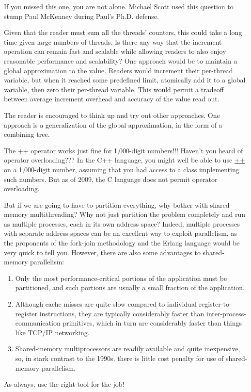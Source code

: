 	If you missed this one, you are not alone.
	Michael Scott used this question to stump Paul McKenney during Paul's
	Ph.D. defense.

\QuickQ{}
	Given that the reader must sum all the threads' counters,
	this could take a long time given large numbers of threads.
	Is there any way that the increment operation can remain
	fast and scalable while allowing readers to also enjoy
	reasonable performance and scalability?
\QuickA{}
	One approach would be to maintain a global approximation
	to the value.
	Readers would increment their per-thread variable, but when it
	reached some predefined limit, atomically add it to a global
	variable, then zero their per-thread variable.
	This would permit a tradeoff between average increment overhead
	and accuracy of the value read out.

	The reader is encouraged to think up and try out other approaches.
	One approach is a generalization of the global approximation,
	in the form of a combining tree.

\QuickQ{}
	The \url{++} operator works just fine for 1,000-digit numbers!!!
	Haven't you heard of operator overloading???
\QuickA{}
	In the C++ language, you might well be able to use \url{++}
	on a 1,000-digit number, assuming that you had access to a
	class implementing such numbers.
	But as of 2009, the C language does not permit operator overloading.

\QuickQ{}
	But if we are going to have to partition everything, why bother
	with shared-memory multithreading?
	Why not just partition the problem completely and run as
	multiple processes, each in its own address space?
\QuickA{}
	Indeed, multiple processes with separate address spaces can be
	an excellent way to exploit parallelism, as the proponents of
	the fork-join methodology and the Erlang language would be very
	quick to tell you.
	However, there are also some advantages to shared-memory parallelism:
	\begin{enumerate}
	\item	Only the most performance-critical portions of the
		application must be partitioned, and such portions
		are usually a small fraction of the application.
	\item	Although cache misses are quite slow compared to
		individual register-to-register instructions,
		they are typically considerably faster than
		inter-process-communication primitives, which in
		turn are considerably faster than things like
		TCP/IP networking.
	\item	Shared-memory multiprocessors are readily available
		and quite inexpensive, so, in stark contrast to the
		1990s, there is little cost penalty for use of
		shared-memory parallelism.
	\end{enumerate}
	As always, use the right tool for the job!

